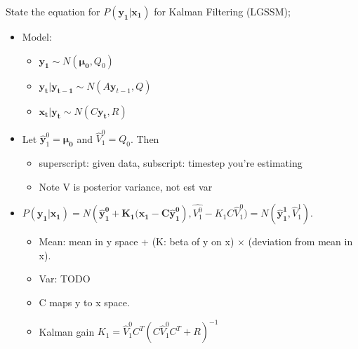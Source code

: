 \documentclass{article}
\begin{document}
State the equation for $P(\mathbf{y_1|x_1})$ for Kalman Filtering (LGSSM); \begin{itemize} \item Model: \begin{itemize} \item $\mathbf{y_1}\sim N(\mathbf{\mu_0},Q_0)$ \item $\mathbf{y_t|y_{t-1}}\sim N(A\mathbf{y}_{t-1}, Q)$ \item $\mathbf{x_t|y_t}\sim N(C\mathbf{y_t},R)$ \end{itemize} \item Let $\hat{\mathbf{y}}^0_1=\mathbf{\mu_0}$ and $\hat{V}^0_1=Q_0$. Then \begin{itemize} \item superscript: given data, subscript: timestep you're estimating \item Note V is posterior variance, not est var \end{itemize} \item $P(\mathbf{y_1|x_1})=N(\mathbf{\hat{y}_1^0+K_1(\mathbf{x_1}-C\hat{\mathbf{y}}^0_1}), \hat{V^0_1}-K_1C\hat{V}^0_1)=N(\mathbf{\hat{y}^1_1}, \hat{V}^1_1)$. \begin{itemize} \item Mean: mean in y space + (K: beta of y on x) $\times$ (deviation from mean in x). \item Var: TODO \item C maps y to x space. \item Kalman gain $K_1=\hat{V}^0_1C^T(C\hat{V}^0_1C^T+R)^{-1}$ \end{itemize} \end{itemize}
    
\end{document}

